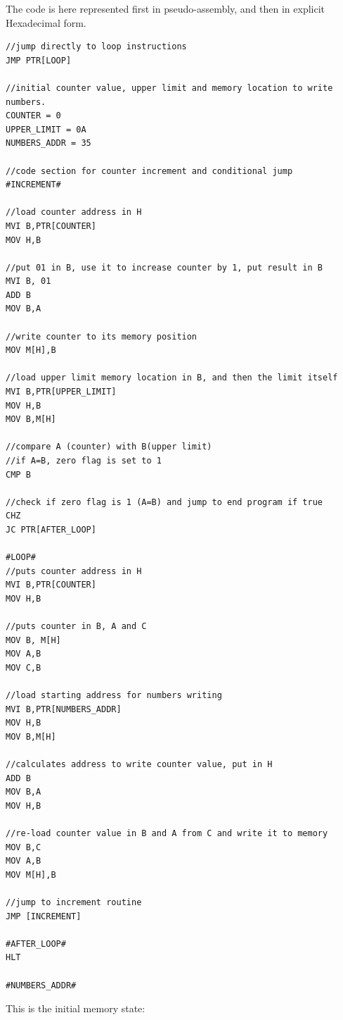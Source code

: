 The code is here represented first in pseudo-assembly, and then in explicit Hexadecimal form.
\FloatBarrier
\begin{verbatim}
//jump directly to loop instructions
JMP PTR[LOOP]

//initial counter value, upper limit and memory location to write numbers.
COUNTER = 0 
UPPER_LIMIT = 0A
NUMBERS_ADDR = 35

//code section for counter increment and conditional jump
#INCREMENT# 

//load counter address in H
MVI B,PTR[COUNTER] 
MOV H,B 

//put 01 in B, use it to increase counter by 1, put result in B
MVI B, 01 
ADD B 
MOV B,A 

//write counter to its memory position
MOV M[H],B  

//load upper limit memory location in B, and then the limit itself
MVI B,PTR[UPPER_LIMIT] 
MOV H,B 
MOV B,M[H] 

//compare A (counter) with B(upper limit)
//if A=B, zero flag is set to 1
CMP B 

//check if zero flag is 1 (A=B) and jump to end program if true
CHZ 
JC PTR[AFTER_LOOP]

#LOOP#
//puts counter address in H
MVI B,PTR[COUNTER]
MOV H,B

//puts counter in B, A and C
MOV B, M[H]
MOV A,B
MOV C,B

//load starting address for numbers writing
MVI B,PTR[NUMBERS_ADDR]
MOV H,B
MOV B,M[H]

//calculates address to write counter value, put in H
ADD B
MOV B,A
MOV H,B

//re-load counter value in B and A from C and write it to memory
MOV B,C
MOV A,B
MOV M[H],B

//jump to increment routine
JMP [INCREMENT]

#AFTER_LOOP# 
HLT

#NUMBERS_ADDR#

\end{verbatim}

This is the initial memory state: \\

